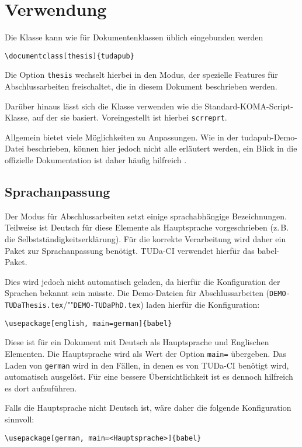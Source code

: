 \documentclass[
	german,%
	ruledheaders=section,%
	class=report,%
	thesis={type=bachelor},%
	accentcolor=9c,%
	custommargins=true,%
	marginpar=false,%
	parskip=half-,%
	fontsize=11pt,%
]{tudapub}
\let\file\texttt
\let\code\texttt
\begin{document}
\chapter{Verwendung}
Die Klasse kann wie für Dokumentenklassen üblich eingebunden werden
\begin{verbatim}
\documentclass[thesis]{tudapub}
\end{verbatim}
Die Option \code{thesis} wechselt hierbei in den Modus, der spezielle Features für Abschlussarbeiten freischaltet, die in diesem Dokument beschrieben werden.

Darüber hinaus lässt sich die Klasse verwenden wie die Standard-KOMA-Script-Klasse, auf der sie basiert.
Voreingestellt ist hierbei \code{scrreprt}.

Allgemein bietet \KOMAScript{} viele Möglichkeiten zu Anpassungen. Wie in der tudapub-Demo-Datei beschrieben, können hier jedoch nicht alle erläutert werden, ein Blick in die offizielle Dokumentation ist daher häufig hilfreich \cite{scrguide}.

\section{Sprachanpassung}
Der Modus für Abschlussarbeiten setzt einige sprachabhängige Bezeichnungen.
Teilweise ist Deutsch für diese Elemente als Hauptsprache vorgeschrieben (z.\,B. die Selbstständigkeitserklärung). Für die korrekte Verarbeitung wird daher ein Paket zur Sprachanpassung benötigt.
TUDa-CI verwendet hierfür das babel-Paket.

Dies wird jedoch nicht automatisch geladen, da hierfür die Konfiguration der Sprachen bekannt sein müsste. Die Demo-Dateien für Abschlussarbeiten (\file{DEMO-TUDaThesis.tex}/""\file{DEMO-TUDaPhD.tex}) laden hierfür die Konfiguration:
\begin{verbatim}
\usepackage[english, main=german]{babel}
\end{verbatim}
Diese ist für ein Dokument mit Deutsch als Hauptsprache und Englischen Elementen.
Die Hauptsprache wird als Wert der Option \verb+main=+ übergeben.
Das Laden von \verb+german+ wird in den Fällen, in denen es von TUDa-CI benötigt wird, automatisch ausgelöst.
Für eine bessere Übersichtlichkeit ist es dennoch hilfreich es dort aufzuführen.

Falls die Hauptsprache nicht Deutsch ist, wäre daher die folgende Konfiguration sinnvoll:
\begin{verbatim}
\usepackage[german, main=<Hauptsprache>]{babel}
\end{verbatim}
\end{document}

